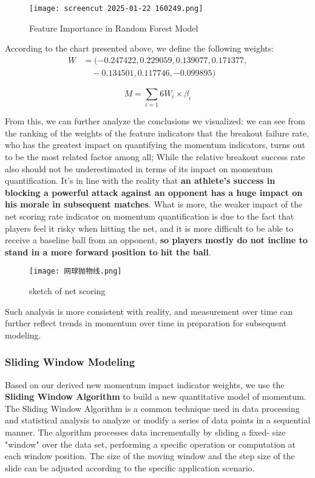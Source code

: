 \documentclass{mcmthesis}
\begin{document}
\begin{figure}[H]
    \centering
    \texttt{[image: screencut 2025-01-22 160249.png]}
    \caption{Feature Importance in Random Forest Model} \label{Figure 16}
\end{figure}

According to the chart presented above, we define the following weights:
\begin{equation} \label{13}
    \begin{split}
        W &= ( -0.247422, 0.229059, 0.139077, 0.171377, \\
        &\quad -0.134501, 0.117746, -0.099895 )
    \end{split}
\end{equation}
    

\begin{equation} \label{14}
    M=\sum_{i=1}{6}W_{i}\times\beta _{i}
\end{equation}

From this, we can further analyze the conclusions we visualized: we can see from the ranking
of the weights of the feature indicators that the breakout failure rate, who has the greatest impact
on quantifying the momentum indicators, turns out to be the most related factor among all; While
the relative breakout success rate also should not be underestimated in terms of its impact on
momentum quantification. It's in line with the reality that {\bf an athlete's success in blocking a
powerful attack against an opponent has a huge impact on his morale in subsequent matches}. What is more, the weaker impact of the net scoring rate indicator on momentum
quantification is due to the fact that players feel it risky when hitting the net, and it is more
difficult to be able to receive a baseline ball from an opponent, {\bf so players mostly do not incline
to stand in a more forward position to hit the ball}.

\begin{figure}[htbp]
    \centering
    \texttt{[image: 网球抛物线.png]}
    \caption{sketch of net scoring} \label{Figure 17}
\end{figure}

Such analysis is more consistent with reality, and measurement over time can further reflect trends in momentum over time in preparation for subsequent modeling.

\subsubsection{Sliding Window Modeling}
Based on our derived new momentum impact indicator weights, we use the {\bf Sliding Window
Algorithm} to build a new quantitative model of momentum. The Sliding Window Algorithm is a
common technique used in data processing and statistical analysis to analyze or modify a series of
data points in a sequential manner. The algorithm processes data incrementally by sliding a fixed- size "window" over the data set, performing a specific operation or computation at each window
position. The size of the moving window and the step size of the slide can be adjusted according
to the specific application scenario. 
\end{document}
